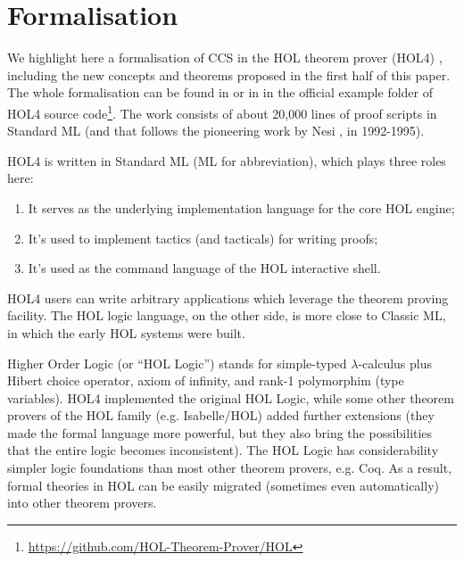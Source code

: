 \section{Formalisation}

We highlight here a formalisation of CCS
in the HOL theorem
prover (HOL4) \cite{slind2008brief},
including the new concepts and theorems proposed in the first half of
this paper.
The whole formalisation can be found 
in \cite{Tian:2017wrba}  or in 
 in the official example folder of HOL4 source
code\footnote{\url{https://github.com/HOL-Theorem-Prover/HOL}}. The
work consists of about 20,000 lines of proof scripts in Standard ML
(and that follows the pioneering work by Nesi \cite{Nesi:1992ve}, in
1992-1995). 

HOL4 is written in Standard ML (ML for abbreviation), which plays three roles here:
\begin{enumerate}
\item It serves as the underlying implementation language for the core HOL engine;
\item It's used to implement tactics (and tacticals) for writing proofs;
\item It's used as the command language of the HOL interactive shell.
\end{enumerate}
HOL4 users can write arbitrary applications which leverage
the theorem proving facility. 
\iflong
The HOL logic language, on the other
 side, is more close to Classic ML, in which the early HOL systems were built.
\fi

Higher Order Logic (or ``HOL Logic'') \cite{hollogic} stands for simple-typed $\lambda$-calculus plus Hibert
choice operator, axiom of infinity, and rank-1 polymorphim (type
variables). HOL4 implemented the original HOL Logic, while
some other theorem provers of the HOL family (e.g. Isabelle/HOL) added
further extensions (they made the formal language more powerful,
but they also bring the possibilities that the entire logic becomes inconsistent).
The HOL Logic has considerability simpler logic
foundations than most other theorem provers, e.g. Coq. As a result,
formal theories in HOL can be easily migrated (sometimes even
automatically) into other theorem provers.


